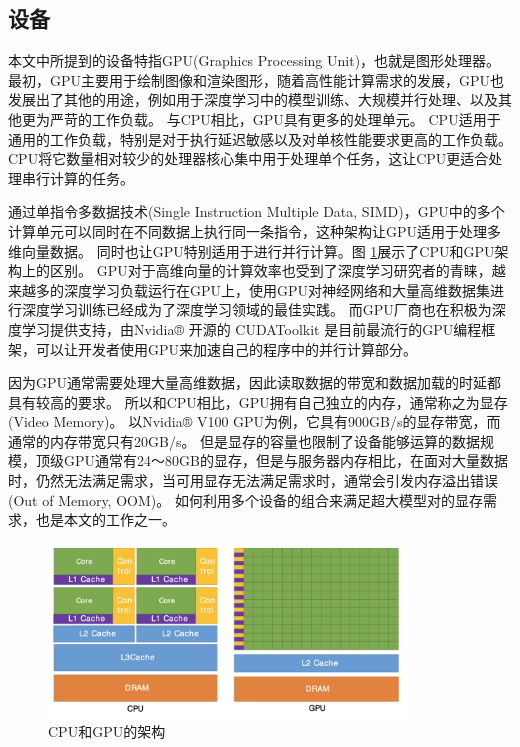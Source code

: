 \subsection{设备}
本文中所提到的设备特指GPU(Graphics Processing Unit)，也就是图形处理器。
最初，GPU主要用于绘制图像和渲染图形，随着高性能计算需求的发展，GPU也发展出了其他的用途，例如用于深度学习中的模型训练、大规模并行处理、以及其他更为严苛的工作负载。
与CPU相比，GPU具有更多的处理单元。
CPU适用于通用的工作负载，特别是对于执行延迟敏感以及对单核性能要求更高的工作负载。
CPU将它数量相对较少的处理器核心集中用于处理单个任务，这让CPU更适合处理串行计算的任务。

通过单指令多数据技术(Single Instruction Multiple Data, SIMD)，GPU中的多个计算单元可以同时在不同数据上执行同一条指令，这种架构让GPU适用于处理多维向量数据。
同时也让GPU特别适用于进行并行计算。图 \ref{fig:cpu-gpu}展示了CPU和GPU架构上的区别。
GPU对于高维向量的计算效率也受到了深度学习研究者的青睐，越来越多的深度学习负载运行在GPU上，使用GPU对神经网络和大量高维数据集进行深度学习训练已经成为了深度学习领域的最佳实践。
而GPU厂商也在积极为深度学习提供支持，由Nvidia® 开源的 CUDAToolkit 是目前最流行的GPU编程框架，可以让开发者使用GPU来加速自己的程序中的并行计算部分。

因为GPU通常需要处理大量高维数据，因此读取数据的带宽和数据加载的时延都具有较高的要求。
所以和CPU相比，GPU拥有自己独立的内存，通常称之为显存(Video Memory)。
以Nvidia® V100 GPU为例，它具有900GB/s的显存带宽，而通常的内存带宽只有20GB/s。
但是显存的容量也限制了设备能够运算的数据规模，顶级GPU通常有24～80GB的显存，但是与服务器内存相比，在面对大量数据时，仍然无法满足需求，当可用显存无法满足需求时，通常会引发内存溢出错误(Out of Memory, OOM)。
如何利用多个设备的组合来满足超大模型对的显存需求，也是本文的工作之一。

\begin{figure}[h]
	\centering
	\includegraphics[width=0.85\textwidth]{figure/2-background/cpu-gpu.png}
	\caption{CPU和GPU的架构}
	\label{fig:cpu-gpu}
\end{figure}

